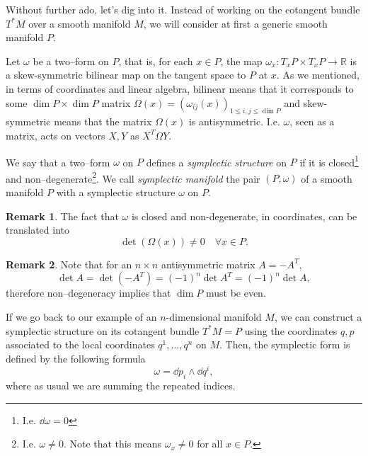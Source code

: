 \documentclass[english,fontsize=11pt,paper=b5]{scrbook}
\theoremstyle{definition}
\newtheorem{remark}{Remark}[chapter]
\begin{document}
    Without further ado, let's dig into it. Instead of working on the cotangent bundle $T^*M$ over a smooth manifold $M$, we will consider at first a generic smooth manifold $P$.

    Let $\omega$ be a two--form on $P$, that is, for each $x\in P$, the map $\omega_x: T_x P \times T_x P \to \mathbb{R}$ is a skew-symmetric bilinear map on the tangent space to $P$ at $x$. As we mentioned, in terms of coordinates and linear algebra, bilinear means that it corresponds to some $\dim P\times \dim P$ matrix $\Omega(x) = \left(\omega_{ij}(x)\right)_{1\leq i,j\leq \dim P}$ and skew-symmetric means that the matrix $\Omega(x)$ is antisymmetric. I.e. $\omega$, seen as a matrix, acts on vectors $X,Y$ as $X^T \Omega Y$.

    \begin{tcolorbox}
      We say that a two--form $\omega$ on $P$ defines a \emph{symplectic structure} on $P$ if it is closed\footnote{I.e. $\dd\omega = 0$}
      and non--degenerate\footnote{I.e. $\omega \neq 0$. Note that this means $\omega_x \neq 0$ for all $x \in P$.}.
      We call \emph{symplectic manifold} the pair $(P, \omega)$ of a smooth manifold $P$ with a symplectic structure $\omega$ on $P$.
    \end{tcolorbox}

    \begin{remark}
      The fact that $\omega$ is closed and non-degenerate, in coordinates, can be translated into
      \begin{equation}
        \det (\Omega(x)) \neq 0 \quad \forall x\in P.
      \end{equation}
    \end{remark}

    \begin{remark}
      Note that for an $n\times n$ antisymmetric matrix $A = - A^T$,
      \begin{equation}
        \det A = \det (-A^T) = (-1)^n \det A^T =  (-1)^n \det A,
      \end{equation}
      therefore non--degeneracy implies that $\dim P$ must be even.
    \end{remark}

    If we go back to our example of an $n$-dimensional manifold $M$, we can construct a symplectic structure on its cotangent bundle $T^*M = P$ using the coordinates $q,p$ associated to the local coordinates $q^1, \ldots, q^n$ on $M$.
    Then, the symplectic form is defined by the following formula
    \begin{equation}\label{eq:canonical2form}
      \omega = \dd p_i \wedge \dd q^i,
    \end{equation}
    where as usual we are summing the repeated indices.
\end{document}
